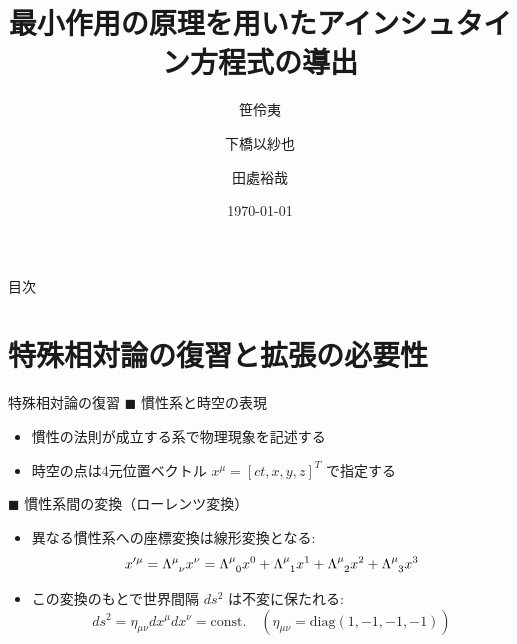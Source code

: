 \documentclass[unicode, aspectratio=169, 12pt]{beamer}
\title{最小作用の原理を用いたアインシュタイン方程式の導出}
\author{笹伶夷\and 下橋以紗也\and 田處裕哉}
\institute{大阪大学 理学部 物理学科}
\date{\today}
\begin{document}
\begin{frame}
    \titlepage
\end{frame}


\begin{frame}{目次}
    \tableofcontents
\end{frame}



\section{特殊相対論の復習と拡張の必要性}

\begin{frame}{特殊相対論の復習}
    $\blacksquare$ 慣性系と時空の表現
    \begin{itemize}
        \item 慣性の法則が成立する系で物理現象を記述する
        \item 時空の点は4元位置ベクトル $x^\mu = [ct, x, y, z]^T$ で指定する
    \end{itemize}

    \vspace{0.8em}
    $\blacksquare$ 慣性系間の変換（ローレンツ変換）
    \begin{itemize}
        \item 異なる慣性系への座標変換は線形変換となる:
        \begin{equation*}
            x'^\mu = \tensor{\Lambda}{^\mu_\nu} x^\nu = \tensor{\Lambda}{^\mu_0} x^0 + \tensor{\Lambda}{^\mu_1} x^1 + \tensor{\Lambda}{^\mu_2} x^2 + \tensor{\Lambda}{^\mu_3} x^3
        \end{equation*}
        \item この変換のもとで世界間隔 $ds^2$ は不変に保たれる:
        \begin{equation*}
            ds^2 = \eta_{\mu\nu} dx^\mu dx^\nu = \mathrm{const.} \quad (\eta_{\mu\nu} = \mathrm{diag}(1,-1,-1,-1))
        \end{equation*}
    \end{itemize}
\end{frame}
\end{document}
